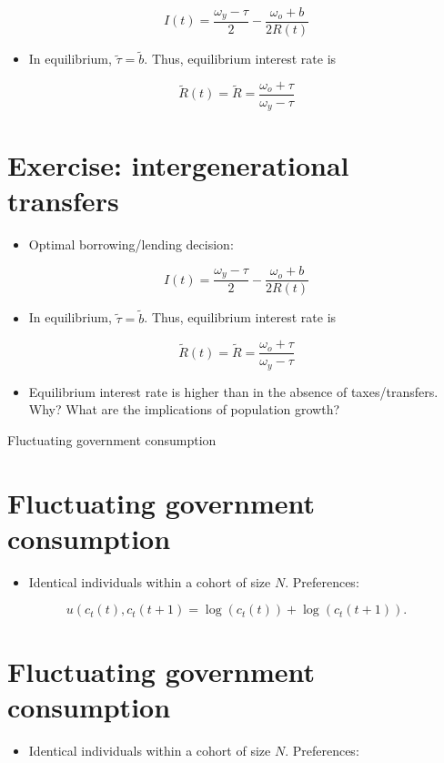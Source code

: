 \documentclass[10pt]{article}
\begin{document}
$$
I(t)=\frac{\omega_{y}-\tau}{2}-\frac{\omega_{o}+b}{2 R(t)}
$$

\begin{itemize}
  \item In equilibrium, $\widetilde{\tau}=\widetilde{b}$. Thus, equilibrium interest rate is
\end{itemize}

$$
\widetilde{R}(t)=\widetilde{R}=\frac{\omega_{o}+\tau}{\omega_{y}-\tau}
$$

\section*{Exercise: intergenerational transfers}
\begin{itemize}
  \item Optimal borrowing/lending decision:
\end{itemize}

$$
I(t)=\frac{\omega_{y}-\tau}{2}-\frac{\omega_{o}+b}{2 R(t)}
$$

\begin{itemize}
  \item In equilibrium, $\widetilde{\tau}=\widetilde{b}$. Thus, equilibrium interest rate is
\end{itemize}

$$
\widetilde{R}(t)=\widetilde{R}=\frac{\omega_{o}+\tau}{\omega_{y}-\tau}
$$

\begin{itemize}
  \item Equilibrium interest rate is higher than in the absence of taxes/transfers. Why? What are the implications of population growth?
\end{itemize}

Fluctuating government consumption

\section*{Fluctuating government consumption}
\begin{itemize}
  \item Identical individuals within a cohort of size $N$. Preferences:
\end{itemize}

$$
u\left(c_{t}(t), c_{t}(t+1)=\log \left(c_{t}(t)\right)+\log \left(c_{t}(t+1)\right) .\right.
$$

\section*{Fluctuating government consumption}
\begin{itemize}
  \item Identical individuals within a cohort of size $N$. Preferences:
\end{itemize}
\end{document}
